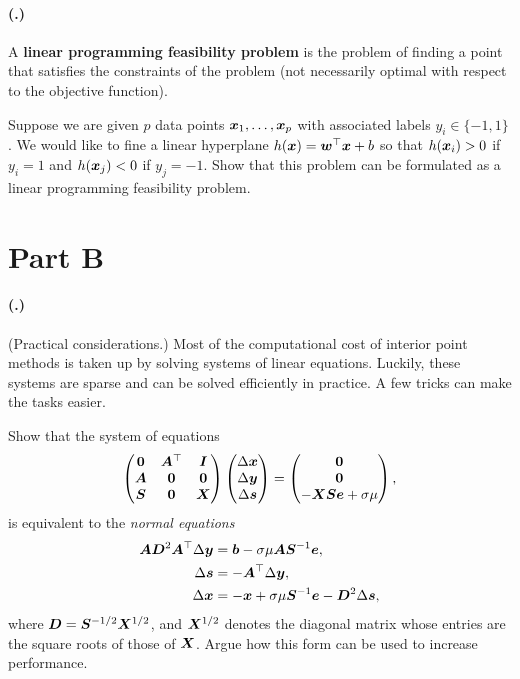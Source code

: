 \documentclass{article}
\newcounter{problemSheetNumber}
\newcounter{problems}
\renewcommand{\problem}{\paragraph{(\theproblemSheetNumber.\theproblems)}\addtocounter{problems}{1}}
\begin{document}
\problem A \textbf{linear programming feasibility problem} is the problem of finding a point that satisfies the constraints of the problem (not necessarily optimal with respect to the objective function).

Suppose we are given $p$ data points $\bm{x}_1,\dots,\bm{x}_p$ with associated labels $y_i\in \{-1,1\}$. We would like to fine a linear hyperplane
$h(\bm{x}) = \bm{w}^{\top}\bm{x}+b$ so that $h(\bm{x}_i)>0$ if $y_i=1$ and
$h(\bm{x}_j)<0$ if $y_j=-1$. Show that this problem can be formulated as a linear programming feasibility problem.

\newpage
%
\section*{Part B}
\problem (Practical considerations.) 
Most of the computational cost of interior point methods is taken up by solving systems of linear equations. Luckily, these systems are sparse and can be solved efficiently in practice. A few tricks can make the tasks easier.

Show that the system of equations
 \begin{equation*}
  \begin{pmatrix}
  \bm{0} & \bm{A}^{\top} & \bm{I} \\
  \bm{A} & \bm{0} & \bm{0} \\
  \bm{S} & \bm{0} & \bm{X}
 \end{pmatrix}
\begin{pmatrix} \Delta\bm{x}\\ \Delta \bm{y}\\ \Delta\bm{s} \end{pmatrix} = \begin{pmatrix} \bm{0} \\ \bm{0} \\ -\bm{X}\bm{S}\bm{e}+\sigma \mu\end{pmatrix},
 \end{equation*}
is equivalent to the {\em normal equations}
\begin{align*}
 \bm{A}\bm{D}^2\bm{A}^{\top} \Delta \bm{y} &= \bm{b}-\sigma \mu \bm{A}\bm{S}^{-1}\bm{e},\\
 \Delta \bm{s} &= -\bm{A}^{\top}\Delta \bm{y},\\
 \Delta \bm{x} &= -\bm{x}+\sigma \mu \bm{S}^{-1}\bm{e}-\bm{D}^{2}\Delta\bm{s},
\end{align*}
where $\bm{D}=\bm{S}^{-1/2}\bm{X}^{1/2}$, and $\bm{X}^{1/2}$ denotes the diagonal matrix whose entries are the square roots of those of $\bm{X}$. Argue how this form can be used to increase performance.
\end{document}
